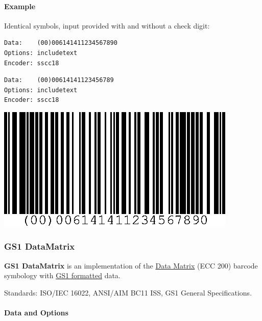\hypertarget{example-3}{%
\paragraph{Example}\label{example-3}}

Identical symbols, input provided with and without a check digit:

\begin{verbatim}
Data:    (00)006141411234567890
Options: includetext
Encoder: sscc18
\end{verbatim}

\begin{verbatim}
Data:    (00)00614141123456789
Options: includetext
Encoder: sscc18
\end{verbatim}

\includegraphics{images/sscc18-1.eps}

\hypertarget{gs1-datamatrix}{%
\subsubsection{GS1 DataMatrix}\label{gs1-datamatrix}}

\textbf{GS1 DataMatrix} is an implementation of the
\protect\hyperlink{data-matrix}{Data Matrix} (ECC 200) barcode symbology
with \protect\hyperlink{gs1-application-identifier-standard-format}{GS1
formatted} data.

Standards: ISO/IEC 16022, ANSI/AIM BC11 ISS, GS1 General Specifications.

\hypertarget{data-and-options-28}{%
\paragraph{Data and Options}\label{data-and-options-28}}


